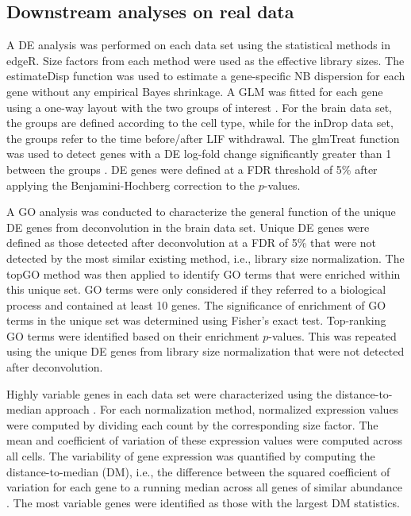 \documentclass{bmcart}
\newcommand{\revised}[1]{#1}
\begin{document}
\subsection*{Downstream analyses on real data}
A DE analysis was performed on each data set using the statistical methods in edgeR.
Size factors from each method were used as the effective library sizes.
The estimateDisp function was used to estimate a gene-specific NB dispersion for each gene \cite{chen2014differential} without any empirical Bayes shrinkage.
A \revised{GLM} was fitted for each gene using a one-way layout with the two groups of interest \cite{mccarthy2012differential}.
For the brain data set, the groups are defined according to the cell type, while for the inDrop data set, the groups refer to the time before/after LIF withdrawal.
The glmTreat function was used to detect genes with a DE log-fold change significantly greater than 1 between the groups \cite{mccarthy2009testing}.
DE genes were defined at a FDR threshold of 5\% after applying the Benjamini-Hochberg correction to the $p$-values.


A GO analysis was conducted to characterize the general function of the unique DE genes from deconvolution in the brain data set.
Unique DE genes were defined as those detected after deconvolution at a FDR of 5\% that were not detected by the most similar existing method, i.e., library size normalization.
The topGO method \cite{alexa2010topgo} was then applied to identify GO terms that were enriched within this unique set.
GO terms were only considered if they referred to a biological process and contained at least 10 genes.
The significance of enrichment of GO terms in the unique set was determined using Fisher's exact test.
Top-ranking GO terms were identified based on their enrichment $p$-values.
This was repeated using the unique DE genes from library size normalization that were not detected after deconvolution.

Highly variable genes in each data set were characterized using the distance-to-median approach \cite{kolod2015single}.
For each normalization method, normalized expression values were computed by dividing each count by the corresponding size factor.
The mean and coefficient of variation of these expression values were computed across all cells.
The variability of gene expression was quantified by computing the distance-to-median (DM), i.e., the difference between the squared coefficient of variation for each gene to a running median across all genes \revised{of} similar abundance \cite{kolod2015single}. 
The most variable genes were identified as those with the largest DM statistics.
\end{document}
